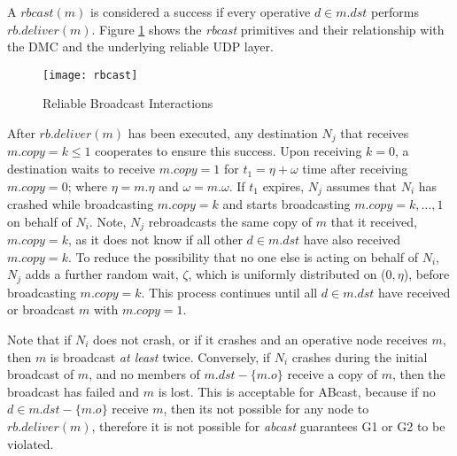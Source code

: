      A $rbcast(m)$ is considered a success if every operative $d \in m.dst$ performs $rb.deliver(m)$.  Figure \ref{fig:rbcast} shows the \emph{rbcast} primitives and their relationship with the DMC and the underlying reliable UDP layer.  
    
    \begin{figure}[!h] 
        \centering    
         \texttt{[image: rbcast]}
         \caption[Reliable Broadcast Interactions]{Reliable Broadcast Interactions}
         \label{fig:rbcast}
    \end{figure}
    
    After $rb.deliver(m)$ has been executed, any destination $N_j$ that receives $m.copy = k \leq 1$ cooperates to ensure this success.  Upon receiving $k = 0$, a destination waits to receive $m.copy = 1$ for ${t_1 = \eta + \omega}$ time after receiving $m.copy = 0$; where $\eta= m.\eta$ and $\omega=m.\omega$.  If $t_1$ expires, $N_j$ assumes that $N_i$ has crashed while broadcasting $m.copy = k$ and starts broadcasting $m.copy = k, \ldots, 1$ on behalf of $N_i$. Note, $N_j$ rebroadcasts the same copy of $m$ that it received, $m.copy = k$, as it does not know if all other $d \in m.dst$ have also received $m.copy = k$.  To reduce the possibility that no one else is acting on behalf of $N_i$, $N_j$ adds a further random wait, $\zeta$, which is uniformly distributed on ($0,\eta$), before broadcasting $m.copy = k$.  This process continues until all $d \in m.dst$ have received or broadcast $m$ with $m.copy = 1$.  
    
    Note that if $N_i$ does not crash, or if it crashes and an operative node receives $m$, then $m$ is broadcast \emph{at least} twice.  Conversely, if $N_i$ crashes during the initial broadcast of $m$, and no members of $m.dst - \{m.o\}$ receive a copy of $m$, then the broadcast has failed and $m$ is lost.  This is acceptable for \textsf{ABcast}, because if no $d \in m.dst - \{m.o\}$ receive $m$, then its not possible for any node to $rb.deliver(m)$, therefore it is not possible for \emph{abcast} guarantees G1 or G2 to be violated.  
    
    
